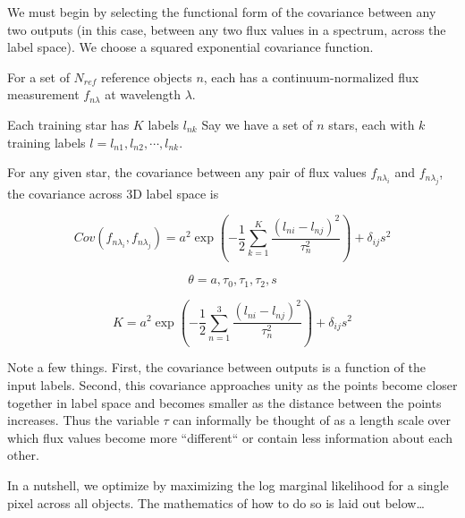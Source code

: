 \documentclass[12pt, preprint]{aastex}
\begin{document}
We must begin by selecting the functional form of the covariance between any 
two outputs (in this case, between any two flux values in a spectrum, across 
the label space). We choose a squared exponential covariance function. 

For a set of $N_{ref}$ reference objects $n$, each has a continuum-normalized
flux measurement $f_{n \lambda}$ at wavelength $\lambda$. 

Each training star has $K$ labels $l_{nk}$ 
Say we have a set of $n$ stars, each with $k$ training labels 
$l = l_{n1}, l_{n2}, \cdots, l_{nk}$.

For any given star, the covariance between any pair of flux values 
$ f_{n \lambda_i}$ and $f_{n \lambda_j}$, the 
covariance across 3D label space is

\begin{equation}
  Cov(f_{n \lambda_i}, f_{n \lambda_j}) = a^2 \exp(-\frac{1}{2} \sum_{k=1}^K \frac{(l_{ni}-l_{nj})^2}{\tau_n^2}) +
  \delta_{ij} s^2
\end{equation}

\begin{equation}
  \theta = a, \tau_0, \tau_1, \tau_2, s
\end{equation}

\begin{equation}
  K = a^2 \exp(-\frac{1}{2} \sum_{n=1}^3 \frac{(l_{ni}-l_{nj})^2}{\tau_n^2}) +
  \delta_{ij} s^2
\end{equation}

Note a few things. First, the covariance between outputs is a function of the 
input labels. Second, this covariance approaches unity as the points become 
closer together in label space and becomes smaller as the distance between 
the points increases. Thus the variable $\tau$ can informally be thought of 
as a length scale over which flux values become more ``different`` or contain 
less information about each other.

In a nutshell, we optimize by maximizing the log marginal likelihood for a 
single pixel across all objects. The mathematics of how to do so is laid out 
below\ldots


\end{document}
